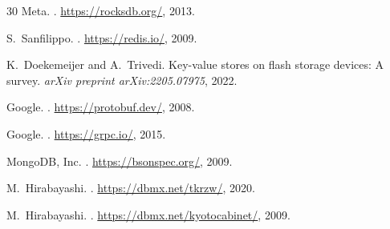 \documentclass[10pt,twocolumn,letterpaper]{article}
\begin{document}
\begin{thebibliography}{30}
{Meta}.
.
\newblock \url{https://rocksdb.org/}, 2013.

S.~Sanfilippo.
.
\newblock \url{https://redis.io/}, 2009.

K.~Doekemeijer and A.~Trivedi.
\newblock Key-value stores on flash storage devices: A survey.
\newblock \emph{arXiv preprint arXiv:2205.07975}, 2022.

{Google}.
.
\newblock \url{https://protobuf.dev/}, 2008.

{Google}.
.
\newblock \url{https://grpc.io/}, 2015.

{MongoDB, Inc.}
.
\newblock \url{https://bsonspec.org/}, 2009.

M.~Hirabayashi.
.
\newblock \url{https://dbmx.net/tkrzw/}, 2020.

M.~Hirabayashi.
.
\newblock \url{https://dbmx.net/kyotocabinet/}, 2009.

\end{thebibliography}
\end{document}
